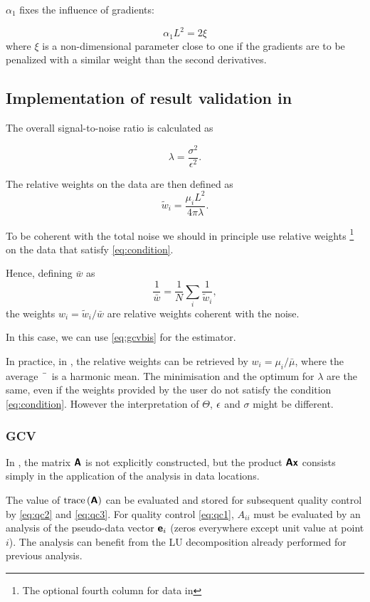 $\alpha_1$ fixes the influence of gradients:

\begin{equation}
\alpha_1 L^2 = 2 \xi
\end{equation}
where $\xi$ is a non-dimensional parameter close to one if the gradients are to be penalized with a similar weight than the second derivatives.


\subsection{Implementation of result validation in \diva\label{sec:qc}}

The overall signal-to-noise ratio is calculated as

\begin{equation}
\lambda = \frac{\sigma^2 }{\epsilon^2}.
\end{equation}

The relative weights on the data are then defined as
\begin{equation}
\tilde{w}_i= \frac{\mu_i L^2}{4 \pi \lambda}.
\end{equation}

To be coherent with the total noise we should in principle use relative weights 
\footnote{The optional fourth column for data in \diva}
on the data that satisfy \eqref{eq:condition}.

Hence, defining $\bar{w}$ as
\begin{equation}
\frac{1}{\bar{w}} = \frac{1}{N} \sum_i \frac{1}{\tilde{w}_i},
\end{equation}
the weights $w_i=\tilde{w}_i/\bar{w}$ are relative weights coherent with the noise.


In this case, we can use \eqref{eq:gcvbis} for the estimator.

In practice, in \diva, the relative weights can be retrieved by $w_i=\mu_i/\bar{\mu}$, where
the average $\bar{\hphantom{\mu}}$ is a harmonic mean. The minimisation and the optimum for $\lambda$ are the same, even if the weights provided by the user do not satisfy the condition \eqref{eq:condition}. However the interpretation of $\Theta$, $\epsilon$ and $\sigma$ might be different.


\subsubsection{\diva GCV}

In \diva, the matrix $\mbox{\boldmath $ \protect\mathsf{A} $}$ is not explicitly constructed, but the product $\mbox{\boldmath $ \protect\mathsf{A} $} \mbox{\boldmath $ \protect\mathsf{x} $}$ consists simply in the application of the analysis in data locations.

The value of $\mathrm{trace}\left( \mbox{\boldmath $ \protect\mathsf{A} $} \right)$ can be evaluated and stored for subsequent quality control by \eqref{eq:qc2} and \eqref{eq:qc3}.
For quality control \eqref{eq:qc1}, $A_{ii}$ must be evaluated by an analysis of the pseudo-data vector $\mbox{\boldmath $ \protect\mathsf{e} $}_i$ (zeros everywhere except unit value at point $i$). The analysis can benefit from the \textsf{LU} decomposition already performed for previous analysis.


